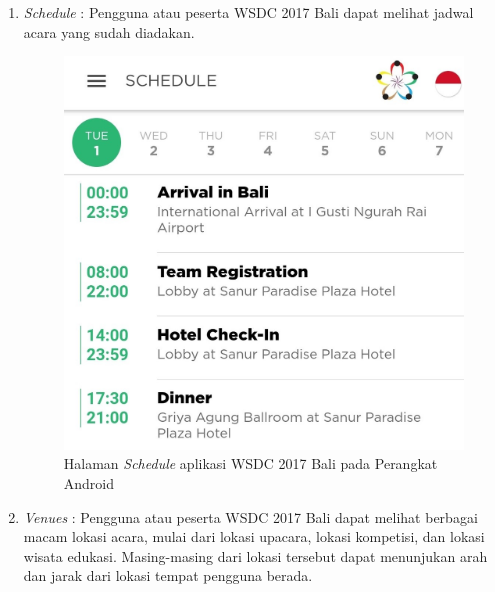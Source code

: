 \begin{enumerate}
	\item {\it Schedule} : Pengguna atau peserta WSDC 2017 Bali dapat melihat jadwal acara yang sudah diadakan.

	\begin{figure}[H]
	    \centering
	    \includegraphics[scale=0.3]{Gambar/Schedule.jpg}
	    \caption{Halaman {\it Schedule} aplikasi WSDC 2017 Bali pada Perangkat Android}
	    \label{fig:wsdcappschedule}
	\end{figure}

\newpage

	\item {\it Venues} : Pengguna atau peserta WSDC 2017 Bali dapat melihat berbagai macam lokasi acara, mulai dari lokasi upacara, lokasi kompetisi, dan lokasi wisata edukasi. Masing-masing dari lokasi tersebut dapat menunjukan arah dan jarak dari lokasi tempat pengguna berada.


\end{enumerate}
